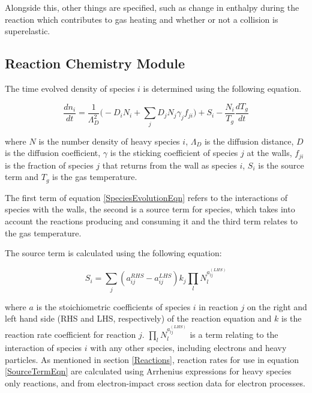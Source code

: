 \documentclass[11pt, oneside]{article}   	%
\begin{document}
Alongside this, other things are specified, such as change in enthalpy during the reaction which contributes to gas heating and whether or not a collision is superelastic.

\subsection{Reaction Chemistry Module}

The time evolved density of species $i$ is determined using the following equation.

\begin{equation}
\frac{dn_i}{dt} = \frac{1}{\Lambda_D^2}\bigg(-D_iN_i + \sum_jD_jN_j\gamma_jf_{ji}\bigg) + S_i - \frac{N_i}{T_g}\frac{dT_g}{dt}
\label{SpeciesEvolutionEqn}
\end{equation}

where $N$ is the number density of heavy species $i$, $\Lambda_D$ is the diffusion distance, $D$ is the diffusion coefficient, $\gamma$ is the sticking coefficient of species $j$ at the walls, $f_{ji}$ is the fraction of species $j$ that returns from the wall as species $i$, $S_i$ is the source term and $T_g$ is the gas temperature.

The first term of equation \ref{SpeciesEvolutionEqn} refers to the interactions of species with the walls, the second is a source term for species, which takes into account the reactions producing and consuming it and the third term relates to the gas temperature.

The source term is calculated using the following equation:

\begin{equation}
S_i = \sum_j(a_{ij}^{RHS}-a_{ij}^{LHS})k_j\prod_lN_l^{a_{lj}^{(LHS)}}
\label{SourceTermEqn}
\end{equation}

where $a$ is the stoichiometric coefficients of species $i$ in reaction $j$ on the right and left hand side (RHS and LHS, respectively) of the reaction equation and $k$ is the reaction rate coefficient for reaction $j$.
$\prod_lN_l^{a_{lj}^{(LHS)}}$ is a term relating to the interaction of species $i$ with any other species, including electrons and heavy particles.
As mentioned in section \ref{Reactions}, reaction rates for use in equation \ref{SourceTermEqn} are calculated using Arrhenius expressions for heavy species only reactions, and from electron-impact cross section data for electron processes. 
\end{document}
